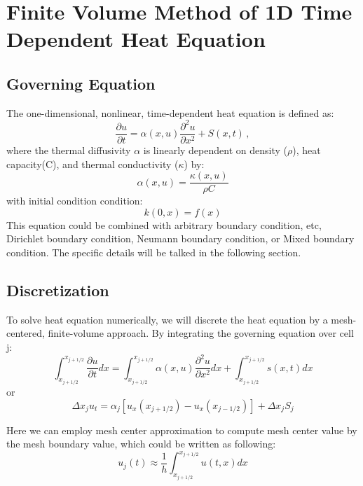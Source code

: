 
\cleardoublepage


\chapter{Finite Volume Method of 1D Time Dependent Heat Equation}

\section{Governing Equation}
The one-dimensional, nonlinear, time-dependent heat equation is defined as:
\begin{equation}
\frac{\partial u}{\partial t} = \alpha(x,u) \frac{\partial^2 u}{\partial x^2} + S(x,t)\, ,
\end{equation}
where the thermal diffusivity $\alpha$ is linearly dependent on density ($\rho$), heat capacity(C), and thermal conductivity ($\kappa$) by:
\begin{equation}
\alpha(x,u) = \frac{\kappa(x,u)}{\rho C}
\end{equation}
with initial condition condition:
\begin{equation}
k(0,x) = f(x) 
\end{equation}
This equation could be combined with arbitrary boundary condition, etc, Dirichlet boundary condition, Neumann boundary condition, or Mixed boundary condition. The specific details will be talked in the following section.

\section{Discretization}
To solve heat equation numerically, we will discrete the heat equation by a mesh-centered, finite-volume approach. By integrating the governing equation over cell j:
\begin{equation}
\int^{x_{j+1/2}}_{x_{j+1/2}} \frac{\partial u}{\partial t} dx =  \int^{x_{j+1/2}}_{x_{j+1/2}} \alpha(x,u) \frac{\partial^2 u}{\partial x^2} dx + \int^{x_{j+1/2}}_{x_{j+1/2}} s(x,t) dx
\end{equation}
or
\begin{equation}
\Delta x_j u_t = \alpha_j [ u_x(x_{j+1/2})- u_x(x_{j-1/2}) ] + \Delta x_j S_j
\end{equation}

Here we can employ mesh center approximation to compute mesh center value by the mesh boundary value, which could be written as following:
\begin{equation}
u_j(t) \approx \frac{1}{h} \int^{x_{j+1/2}}_{x_{j+1/2}} u(t,x) dx
\end{equation}

